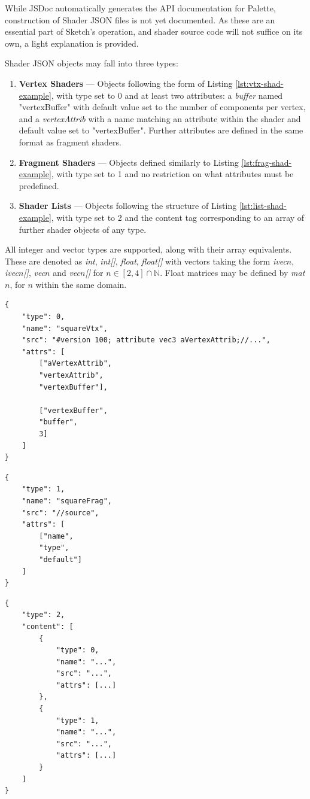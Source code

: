\documentclass{l3proj}
\begin{document}
While JSDoc automatically generates the API documentation for Palette, construction of Shader JSON files is not yet documented. As these are an essential part of Sketch's operation, and shader source code will not suffice on its own, a light explanation is provided.

Shader JSON objects may fall into three types:
\begin{enumerate}
\item \textbf{Vertex Shaders} --- Objects following the form of Listing \ref{lst:vtx-shad-example}, with type set to 0 and at least two attributes: a \textit{buffer} named "vertexBuffer" with default value set to the number of components per vertex, and a \textit{vertexAttrib} with a name matching an attribute within the shader and default value set to "vertexBuffer". Further attributes are defined in the same format as fragment shaders.
\item \textbf{Fragment Shaders} --- Objects defined similarly to Listing \ref{lst:frag-shad-example}, with type set to 1 and no restriction on what attributes must be predefined.
\item \textbf{Shader Lists} --- Objects following the structure of Listing \ref{lst:list-shad-example}, with type set to 2 and the content tag corresponding to an array of further shader objects of any type.
\end{enumerate}
All integer and vector types are supported, along with their array equivalents. These are denoted as \textit{int}, \textit{int[]}, \textit{float}, \textit{float[]} with vectors taking the form \textit{ivec$n$}, \textit{ivec$n$[]}, \textit{vec$n$} and \textit{vec$n$[]} for $ n \in [2,4]\cap\mathbb{N}$. Float matrices may be defined by \textit{mat$n$}, for $n$ within the same domain.
\begin{center}
\lstset{%
      basicstyle=\ttfamily\footnotesize\bfseries,
      frame=single,
      xleftmargin=.1\textwidth, xrightmargin=.1\textwidth,
      captionpos=b,
      tabsize=4,
      language=json
    }
\begin{lstlisting}[caption={Vertex Shader JSON Structure},label={lst:vtx-shad-example}]
{
	"type": 0,
	"name": "squareVtx",
	"src": "#version 100; attribute vec3 aVertexAttrib;//...",
	"attrs": [
		["aVertexAttrib",
		"vertexAttrib",
		"vertexBuffer"],
		
		["vertexBuffer",
		"buffer",
		3]
	]
}
\end{lstlisting}
\clearpage
\begin{lstlisting}[caption={Fragment Shader JSON Structure},label={lst:frag-shad-example}]
{
	"type": 1,
	"name": "squareFrag",
	"src": "//source",
	"attrs": [
		["name",
		"type",
		"default"]
	]
}
\end{lstlisting}
\begin{lstlisting}[caption={Shader List JSON Structure},label={lst:list-shad-example}]
{
	"type": 2,
	"content": [
		{
			"type": 0,
			"name": "...",
			"src": "...",
			"attrs": [...]
		},
		{
			"type": 1,
			"name": "...",
			"src": "...",
			"attrs": [...]
		}
	]
}
\end{lstlisting}
\end{center}
\end{document}
